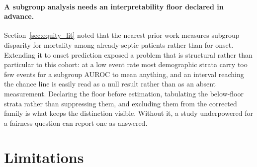 \paragraph{A subgroup analysis needs an interpretability floor declared in
advance.}
Section~\ref{sec:equity_lit} noted that the nearest prior work measures
subgroup disparity for mortality among already-septic patients rather than for
onset. Extending it to onset prediction exposed a problem that is structural
rather than particular to this cohort: at a low event rate most demographic
strata carry too few events for a subgroup AUROC to mean anything, and an
interval reaching the chance line is easily read as a null result rather than
as an absent measurement. Declaring the floor before estimation, tabulating the
below-floor strata rather than suppressing them, and excluding them from the
corrected family is what keeps the distinction visible. Without it, a study
underpowered for a fairness question can report one as answered.


\section{Limitations}
\label{sec:limitations}

